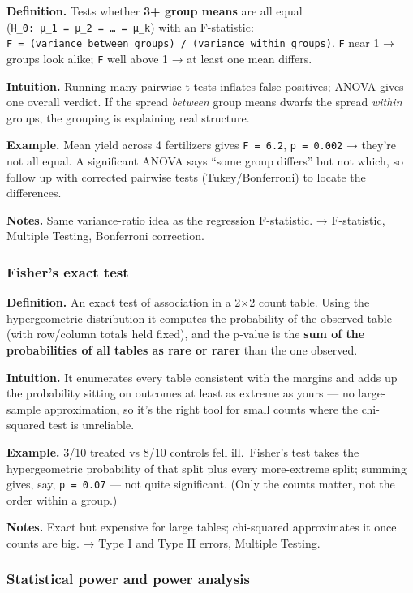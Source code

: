 \documentclass[
  10pt,
  letterpaper,
  onecolumn]{article}
\begin{document}
\textbf{Definition.} Tests whether \textbf{3+ group means} are all equal
(\texttt{H\_0:\ μ\_1\ =\ μ\_2\ =\ …\ =\ μ\_k}) with an F-statistic:
\texttt{F\ =\ (variance\ between\ groups)\ /\ (variance\ within\ groups)}.
\texttt{F} near 1 → groups look alike; \texttt{F} well above 1 → at
least one mean differs.

\textbf{Intuition.} Running many pairwise t-tests inflates false
positives; ANOVA gives one overall verdict. If the spread \emph{between}
group means dwarfs the spread \emph{within} groups, the grouping is
explaining real structure.

\textbf{Example.} Mean yield across 4 fertilizers gives
\texttt{F\ =\ 6.2}, \texttt{p\ =\ 0.002} → they're not all equal. A
significant ANOVA says ``some group differs'' but not which, so follow
up with corrected pairwise tests (Tukey/Bonferroni) to locate the
differences.

\textbf{Notes.} Same variance-ratio idea as the regression F-statistic.
→ F-statistic, Multiple Testing, Bonferroni correction.

\hypertarget{fishers-exact-test}{%
\subsubsection{Fisher's exact test}\label{fishers-exact-test}}

\textbf{Definition.} An exact test of association in a 2×2 count table.
Using the hypergeometric distribution it computes the probability of the
observed table (with row/column totals held fixed), and the p-value is
the \textbf{sum of the probabilities of all tables as rare or rarer}
than the one observed.

\textbf{Intuition.} It enumerates every table consistent with the
margins and adds up the probability sitting on outcomes at least as
extreme as yours --- no large-sample approximation, so it's the right
tool for small counts where the chi-squared test is unreliable.

\textbf{Example.} 3/10 treated vs 8/10 controls fell ill.~Fisher's test
takes the hypergeometric probability of that split plus every
more-extreme split; summing gives, say, \texttt{p\ =\ 0.07} --- not
quite significant. (Only the counts matter, not the order within a
group.)

\textbf{Notes.} Exact but expensive for large tables; chi-squared
approximates it once counts are big. → Type I and Type II errors,
Multiple Testing.

\hypertarget{statistical-power-and-power-analysis}{%
\subsubsection{Statistical power and power
analysis}\label{statistical-power-and-power-analysis}}
\end{document}
